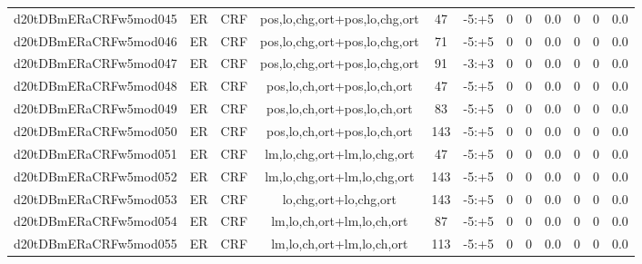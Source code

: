 \documentclass[a4paper]{article}
\begin{document}
\begin{landscape}
\begin{center}
\begin{tabular}{ |c|c|c|c|c|c|c|c|c|c|c|c|}
 
 	
 	\small{ d20tDBmERaCRFw5mod045 } & ER & CRF & pos,lo,chg,ort+pos,lo,chg,ort  &  47 &  -5:+5  &  0 & 0 & 0.0  &  0 & 0 & 0.0 \\
 	

 
 	
 	\small{ d20tDBmERaCRFw5mod046 } & ER & CRF & pos,lo,chg,ort+pos,lo,chg,ort  &  71 &  -5:+5  &  0 & 0 & 0.0  &  0 & 0 & 0.0 \\
 	

 
 	
 	\small{ d20tDBmERaCRFw5mod047 } & ER & CRF & pos,lo,chg,ort+pos,lo,chg,ort  &  91 &  -3:+3  &  0 & 0 & 0.0  &  0 & 0 & 0.0 \\
 	

 
 	
 	\small{ d20tDBmERaCRFw5mod048 } & ER & CRF & pos,lo,ch,ort+pos,lo,ch,ort  &  47 &  -5:+5  &  0 & 0 & 0.0  &  0 & 0 & 0.0 \\
 	

 
 	
 	\small{ d20tDBmERaCRFw5mod049 } & ER & CRF & pos,lo,ch,ort+pos,lo,ch,ort  &  83 &  -5:+5  &  0 & 0 & 0.0  &  0 & 0 & 0.0 \\
 	

 
 	
 	\small{ d20tDBmERaCRFw5mod050 } & ER & CRF & pos,lo,ch,ort+pos,lo,ch,ort  &  143 &  -5:+5  &  0 & 0 & 0.0  &  0 & 0 & 0.0 \\
 	

 
 	
 	\small{ d20tDBmERaCRFw5mod051 } & ER & CRF & lm,lo,chg,ort+lm,lo,chg,ort  &  47 &  -5:+5  &  0 & 0 & 0.0  &  0 & 0 & 0.0 \\
 	

 
 	
 	\small{ d20tDBmERaCRFw5mod052 } & ER & CRF & lm,lo,chg,ort+lm,lo,chg,ort  &  143 &  -5:+5  &  0 & 0 & 0.0  &  0 & 0 & 0.0 \\
 	

 
 	
 	\small{ d20tDBmERaCRFw5mod053 } & ER & CRF & lo,chg,ort+lo,chg,ort  &  143 &  -5:+5  &  0 & 0 & 0.0  &  0 & 0 & 0.0 \\
 	

 
 	
 	\small{ d20tDBmERaCRFw5mod054 } & ER & CRF & lm,lo,ch,ort+lm,lo,ch,ort  &  87 &  -5:+5  &  0 & 0 & 0.0  &  0 & 0 & 0.0 \\
 	

 
 	
 	\small{ d20tDBmERaCRFw5mod055 } & ER & CRF & lm,lo,ch,ort+lm,lo,ch,ort  &  113 &  -5:+5  &  0 & 0 & 0.0  &  0 & 0 & 0.0 \\
 	


\end{tabular}
\end{center}
\end{landscape}
\end{document}
